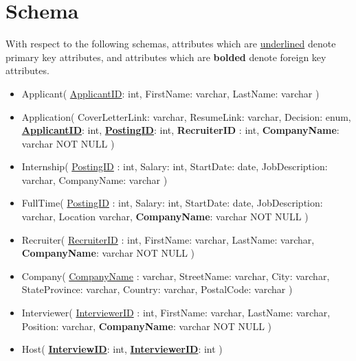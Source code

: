 \setcounter{section}{1}
\section{Schema}

With respect to the following schemas,
attributes which are \underline{underlined} denote primary key attributes,
and attributes which are \textbf{bolded}  denote foreign key attributes.

\begin{itemize}

  \item Applicant(
      \underline{ApplicantID}: int, 
      FirstName: varchar, 
      LastName: varchar
    )

  \item Application(
      CoverLetterLink: varchar, 
      ResumeLink: varchar,
      Decision: enum,
      \underline{\textbf{ApplicantID}}: int,
      \underline{\textbf{PostingID}}: int,
      \textbf{RecruiterID} : int,
      \textbf{CompanyName}: varchar NOT NULL
    )

  \item Internship(
      \underline{PostingID} : int,
      Salary: int,
      StartDate: date,
      JobDescription: varchar,
      CompanyName: varchar
    )

  \item FullTime(
      \underline{PostingID} : int,
      Salary: int,
      StartDate: date,
      JobDescription: varchar,
      Location varchar,
      \textbf{CompanyName}: varchar NOT NULL
    )

  \item Recruiter(
      \underline{RecruiterID} : int,
      FirstName: varchar,
      LastName: varchar,
      \textbf{CompanyName}: varchar NOT NULL
    )

  \item Company(
      \underline{CompanyName} : varchar,
      StreetName: varchar,
      City: varchar,
      StateProvince: varchar,
      Country: varchar,
      PostalCode: varchar
    )

  \item Interviewer(
      \underline{InterviewerID} : int,
      FirstName: varchar,
      LastName: varchar,
      Position: varchar,
      \textbf{CompanyName}: varchar NOT NULL
    )

  \item Host(
      \underline{\textbf{InterviewID}}: int,
      \underline{\textbf{InterviewerID}}: int
    )


\end{itemize}
